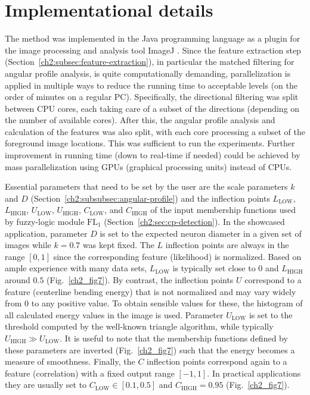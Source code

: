 \section{Implementational details}
\label{ch2:sec:implementation-details}
The method was implemented in the Java programming language as a plugin for the image processing and analysis tool ImageJ \cite{abramoff2004image, schneider2012nih}. Since the feature extraction step (Section~\ref{ch2:subsec:feature-extraction}), in particular the matched filtering for angular profile analysis, is quite computationally demanding, parallelization is applied in multiple ways to reduce the running time to acceptable levels (on the order of minutes on a regular PC). Specifically, the directional filtering was split between CPU cores, each taking care of a subset of the directions (depending on the number of available cores). After this, the angular profile analysis and calculation of the features was also split, with each core processing a subset of the foreground image locations. This was sufficient to run the experiments. Further improvement in running time (down to real-time if needed) could be achieved by mass parallelization using GPUs (graphical processing units) instead of CPUs.

Essential parameters that need to be set by the user are the scale parameters $k$ and $D$ (Section~\ref{ch2:subsubsec:angular-profile}) and the inflection points $L_{\mathrm{LOW}}$, $L_{\mathrm{HIGH}}$, $U_{\mathrm{LOW}}$, $U_{\mathrm{HIGH}}$, $C_{\mathrm{LOW}}$, and $C_{\mathrm{HIGH}}$ of the input membership functions used by fuzzy-logic module $\textrm{FL}_{1}$ (Section~\ref{ch2:sec:cp-detection}). In the showcased application, parameter $D$ is set to the expected neuron diameter in a given set of images while $k=0.7$ was kept fixed. The $L$ inflection points are always in the range $[0,1]$ since the corresponding feature (likelihood) is normalized. Based on ample experience with many data sets, $L_{\mathrm{LOW}}$ is typically set close to 0 and $L_{\mathrm{HIGH}}$ around $0.5$ (Fig.~\ref{ch2_fig7}). By contrast, the inflection points $U$ correspond to a feature (centerline bending energy) that is not normalized and may vary widely from $0$ to any positive value. To obtain sensible values for these, the histogram of all calculated energy values in the image is used. Parameter $U_{\mathrm{LOW}}$ is set to the threshold computed by the well-known triangle algorithm, while typically $U_{\mathrm{HIGH}}\gg U_{\mathrm{LOW}}$. It is useful to note that the membership functions defined by these parameters are inverted (Fig.~\ref{ch2_fig7}) such that the energy becomes a measure of smoothness. Finally, the $C$ inflection points correspond again to a feature (correlation) with a fixed output range $[-1,1]$. In practical applications they are usually set to $C_{\mathrm{LOW}}\in[0.1,0.5]$ and $C_{\mathrm{HIGH}}=0.95$  (Fig.~\ref{ch2_fig7}).


